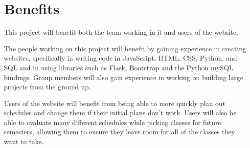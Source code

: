 \section{Benefits}
This project will benefit both the team working in it and users of the website.

The people working on this project will benefit by gaining experience in
creating websites, specifically in writing code in JavaScript, HTML, CSS,
Python, and SQL and in using libraries such as Flask, Bootstrap and the Python
mySQL bindings.  Group members will also gain experience in working on building
large projects from the ground up.

Users of the website will benefit from being able to more quickly plan out
schedules and change them if their initial plans don't work.  Users will also
be able to evaluate many different schedules while picking classes for future
semesters, allowing them to ensure they leave room for all of the classes they
want to take.

